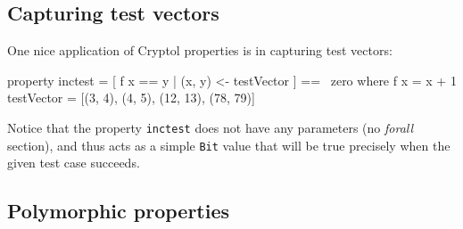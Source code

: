 \subsection{Capturing test vectors}
\label{sec:thmvec}

One nice application of Cryptol properties is in capturing test
vectors:\indZero
\begin{code}
  property inctest = [ f x == y | (x, y) <- testVector ] == ~zero
    where  f x = x + 1
           testVector = [(3, 4), (4, 5), (12, 13), (78, 79)]
\end{code}
Notice that the property \texttt{inctest} does not have any parameters
(no \emph{forall} section), and thus acts as a simple \texttt{Bit} value
that will be true precisely when the given test case succeeds.


\subsection{Polymorphic properties}
\label{sec:polythm}

